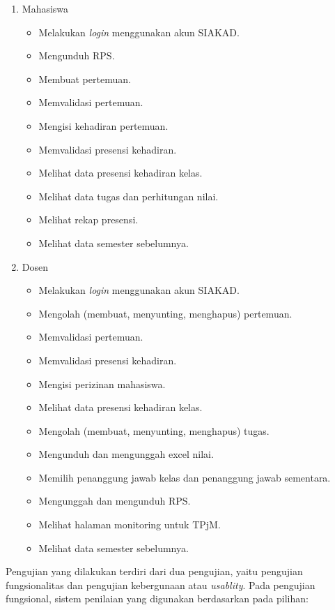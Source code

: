 \begin{enumerate}
	\item Mahasiswa
	\begin{itemize}
		\item Melakukan \textit{login} menggunakan akun SIAKAD.
		\item Mengunduh RPS.
		\item Membuat pertemuan.
		\item Memvalidasi pertemuan.
		\item Mengisi kehadiran pertemuan.
		\item Memvalidasi presensi kehadiran.
		\item Melihat data presensi kehadiran kelas.
		\item Melihat data tugas dan perhitungan nilai.
		\item Melihat rekap presensi.
		\item Melihat data semester sebelumnya.
	\end{itemize}
	\item Dosen
	\begin{itemize}
		\item Melakukan \textit{login} menggunakan akun SIAKAD.
		\item Mengolah (membuat, menyunting, menghapus) pertemuan.
		\item Memvalidasi pertemuan.
		\item Memvalidasi presensi kehadiran.
		\item Mengisi perizinan mahasiswa.
		\item Melihat data presensi kehadiran kelas.
		\item Mengolah (membuat, menyunting, menghapus) tugas.
		\item Mengunduh dan mengunggah excel nilai.
		\item Memilih penanggung jawab kelas dan penanggung jawab sementara.
		\item Mengunggah dan mengunduh RPS.
		\item Melihat halaman monitoring untuk TPjM.
		\item Melihat data semester sebelumnya.
	\end{itemize}
\end{enumerate}

Pengujian yang dilakukan terdiri dari dua pengujian, yaitu pengujian fungsionalitas dan pengujian kebergunaan atau \textit{usablity}. Pada pengujian fungsional, sistem penilaian yang digunakan berdasarkan pada pilihan: \\

